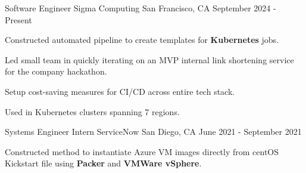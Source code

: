 \begin{cventries}
  \cventry
    {Software Engineer}
    {Sigma Computing}
    {San Francisco, CA}
    {September 2024 - Present}
    {
      \begin{cvitems}
        \item {Constructed automated pipeline to create templates for \textbf{Kubernetes} jobs.}
        \item {Led small team in quickly iterating on an MVP internal link shortening service for the company hackathon.}
        \item {Setup cost-saving measures for CI/CD across entire tech stack.}
        \item {Used in Kubernetes clusters spanning 7 regions.}
      \end{cvitems}
    }
  \cventry
    {Systems Engineer Intern}
    {ServiceNow}
    {San Diego, CA}
    {June 2021 - September 2021}
    {
      \begin{cvitems}
        \item {Constructed method to instantiate Azure VM images directly from centOS Kickstart file using \textbf{Packer} and \textbf{VMWare vSphere}.}

\end{cvitems}}
\end{cventries}
